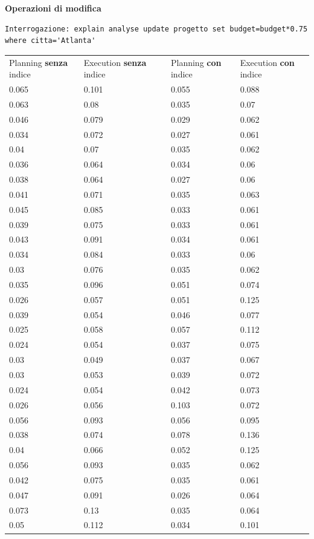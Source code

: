 \documentclass{article}
\begin{document}
\newpage
\noindent
\textbf{Operazioni di modifica}
\begin{verbatim}
Interrogazione: explain analyse update progetto set budget=budget*0.75 where citta='Atlanta'
\end{verbatim}
\begin{table}[H]
\renewcommand{\arraystretch}{1.2}
\centering
\begin{tabular}{|p{4cm}|p{4cm}|p{0cm}|p{4cm}|p{4cm}|}
\cline{1-5}
Planning \textbf{senza} indice & Execution \textbf{senza} indice & & Planning \textbf{con} indice & Execution \textbf{con} indice \\ \cline{1-5}
0.065 & 0.101 & & 0.055 & 0.088 \\ \cline{1-5}
0.063 & 0.08 & & 0.035 & 0.07 \\ \cline{1-5}
0.046 & 0.079 & & 0.029 & 0.062 \\ \cline{1-5}
0.034 & 0.072 & & 0.027 & 0.061 \\ \cline{1-5}
0.04 & 0.07 & & 0.035 & 0.062 \\ \cline{1-5}
0.036 & 0.064 & & 0.034 & 0.06 \\ \cline{1-5}
0.038 & 0.064 & & 0.027 & 0.06 \\ \cline{1-5}
0.041 & 0.071 & & 0.035 & 0.063 \\ \cline{1-5}
0.045 & 0.085 & & 0.033 & 0.061 \\ \cline{1-5}
0.039 & 0.075 & & 0.033 & 0.061 \\ \cline{1-5}
0.043 & 0.091 & & 0.034 & 0.061 \\ \cline{1-5}
0.034 & 0.084 & & 0.033 & 0.06 \\ \cline{1-5}
0.03 & 0.076 & & 0.035 & 0.062 \\ \cline{1-5}
0.035 & 0.096 & & 0.051 & 0.074 \\ \cline{1-5}
0.026 & 0.057 & & 0.051 & 0.125 \\ \cline{1-5}
0.039 & 0.054 & & 0.046 & 0.077 \\ \cline{1-5}
0.025 & 0.058 & & 0.057 & 0.112 \\ \cline{1-5}
0.024 & 0.054 & & 0.037 & 0.075 \\ \cline{1-5}
0.03 & 0.049 & & 0.037 & 0.067 \\ \cline{1-5}
0.03 & 0.053 & & 0.039 & 0.072 \\ \cline{1-5}
0.024 & 0.054 & & 0.042 & 0.073 \\ \cline{1-5}
0.026 & 0.056 & & 0.103 & 0.072 \\ \cline{1-5}
0.056 & 0.093 & & 0.056 & 0.095 \\ \cline{1-5}
0.038 & 0.074 & & 0.078 & 0.136 \\ \cline{1-5}
0.04 & 0.066 & & 0.052 & 0.125 \\ \cline{1-5}
0.056 & 0.093 & & 0.035 & 0.062 \\ \cline{1-5}
0.042 & 0.075 & & 0.035 & 0.061 \\ \cline{1-5}
0.047 & 0.091 & & 0.026 & 0.064 \\ \cline{1-5}
0.073 & 0.13 & & 0.035 & 0.064 \\ \cline{1-5}
0.05 & 0.112 & & 0.034 & 0.101 \\ \cline{1-5}
\end{tabular}
\end{table}
\end{document}
